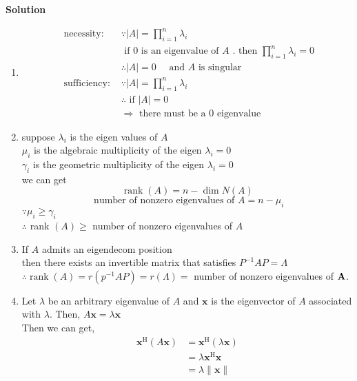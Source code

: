 \documentclass[english,onecolumn]{IEEEtran}
\begin{document}
\noindent
\textbf{Solution}
\begin{enumerate}
    \item 
    $$
    \begin{aligned}
    	\text { necessity: } & \because|A|=\prod_{i=1}^{n} \lambda_{i} \\
    	& \text { if } 0 \text { is an eigenvalue of } A \text { . then } \prod_{i=1}^{n} \lambda_{i}=0 \\
    	& \therefore|A|=0 \quad \text { and } A \text { is singular } \\
    	\text { sufficiency: }  & \because|A|=\prod_{i=1}^{n} \lambda_{i} \\
    	& \therefore \text { if }|A|=0 \\
    	& \Rightarrow \text { there must be a } 0 \text { eigenvalue }
    \end{aligned}
    $$
    \item 
    suppose $\lambda_{i}$ is the eigen values of $A$\\
    $\mu_{i}$ is the algebraic multiplicity of the eigen $\lambda_{i}=0$\\
    $\gamma_{i}$ is the geometric multiplicity of the eigen $\lambda_{i}=0$\\
    we can get   
    $$
    \operatorname{rank}(A)=n-\operatorname{dim} N(A)
    $$
    $$
    \text { number of nonzero eigenvalues of } A=n-\mu_i
    $$
    $\because \mu_{i} \geqslant \gamma_{i}$\\
    $\therefore$ rank $(A) \geqslant$ number of nonzero eigenvalues of $A$
    \item
    If $A$ admits an eigendecom position\\
    then there exists an invertible matrix that satisfies $P^{-1} A P=\Lambda$\\
    $\therefore \operatorname{rank}(A)=r\left(p^{-1} A P\right)=r(\Lambda)=$
    number of nonzero eigenvalues of ${\bf A}$.
    \item
    Let $\lambda$ be an arbitrary eigenvalue of $A$ and $\mathbf{x}$ is the eigenvector of $A$ associated with $\lambda$.
    Then,
    $
    A \mathbf{x}=\lambda \mathbf{x}
    $\\
    Then we can get, 
    $$
    \begin{aligned} \mathbf{x}^{\mathrm{H}}(A \mathbf{x}) &=\mathbf{x}^{\mathrm{H}}(\lambda \mathbf{x}) \\ &=\lambda \mathbf{x}^{\mathrm{H}} \mathbf{x} \\ &=\lambda\|\mathbf{x}\| \end{aligned}
$$
\end{enumerate}
\end{document}
